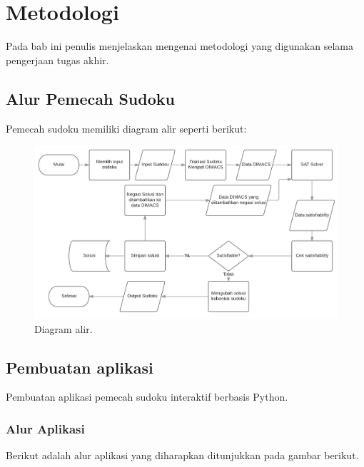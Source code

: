 \chapter{Metodologi}

Pada bab ini penulis menjelaskan mengenai metodologi yang digunakan selama pengerjaan tugas akhir.


\section{Alur Pemecah Sudoku}

Pemecah sudoku memiliki diagram alir seperti berikut:

\begin{figure}[H]
	\begin{centering}
		\includegraphics[scale=0.5]{gambar/diagramAlir.png}
		
		\caption{Diagram alir.}
	\end{centering}
\end{figure}

\section{Pembuatan aplikasi}

Pembuatan aplikasi pemecah sudoku interaktif berbasis Python.

\subsection{Alur Aplikasi}

Berikut adalah alur aplikasi yang diharapkan ditunjukkan pada gambar berikut.

